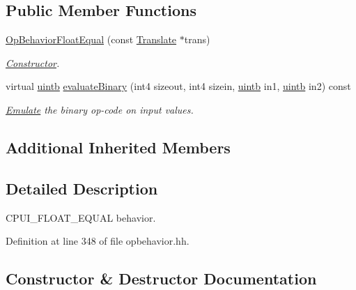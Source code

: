 \subsection*{Public Member Functions}
\begin{DoxyCompactItemize}
\item 
\mbox{\hyperlink{class_op_behavior_float_equal_af733032ffb9b7bed6f330003d03b99a8}{Op\+Behavior\+Float\+Equal}} (const \mbox{\hyperlink{class_translate}{Translate}} $\ast$trans)
\begin{DoxyCompactList}\small\item\em \mbox{\hyperlink{class_constructor}{Constructor}}. \end{DoxyCompactList}\item 
virtual \mbox{\hyperlink{types_8h_a2db313c5d32a12b01d26ac9b3bca178f}{uintb}} \mbox{\hyperlink{class_op_behavior_float_equal_a108413ce9077413fd528e214c4d0a6b5}{evaluate\+Binary}} (int4 sizeout, int4 sizein, \mbox{\hyperlink{types_8h_a2db313c5d32a12b01d26ac9b3bca178f}{uintb}} in1, \mbox{\hyperlink{types_8h_a2db313c5d32a12b01d26ac9b3bca178f}{uintb}} in2) const
\begin{DoxyCompactList}\small\item\em \mbox{\hyperlink{class_emulate}{Emulate}} the binary op-\/code on input values. \end{DoxyCompactList}\end{DoxyCompactItemize}
\subsection*{Additional Inherited Members}


\subsection{Detailed Description}
C\+P\+U\+I\+\_\+\+F\+L\+O\+A\+T\+\_\+\+E\+Q\+U\+AL behavior. 

Definition at line 348 of file opbehavior.\+hh.



\subsection{Constructor \& Destructor Documentation}
\mbox{\label{class_op_behavior_float_equal_af733032ffb9b7bed6f330003d03b99a8}} 

